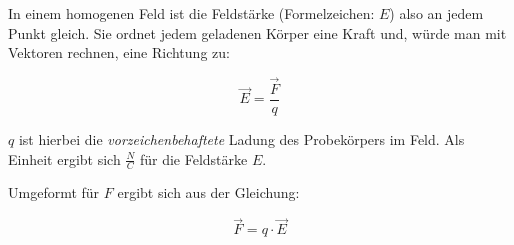 In einem homogenen Feld ist die Feldstärke (Formelzeichen: $E$) also an jedem Punkt gleich. Sie ordnet jedem geladenen Körper eine Kraft und, würde man mit Vektoren rechnen, eine Richtung zu:

\begin{equation} \label{eq:feldstaerke}
	\vec{E} = \frac{\vec{F}}{q}
\end{equation}

\noindent $q$ ist hierbei die \emph{vorzeichenbehaftete} Ladung des Probekörpers im Feld. Als Einheit ergibt sich $\frac{N}{C}$ für die Feldstärke $E$. 

Umgeformt für $F$ ergibt sich aus der Gleichung:

\begin{equation} \label{eq:feldstaerke_nach_F}
	\vec{F} = q \cdot \vec{E}
\end{equation}








